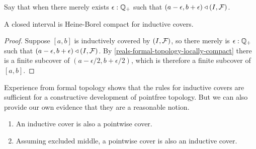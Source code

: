 Say that  when there merely exists $\epsilon : \mathbb{Q}_{+}$ such that $(a - \epsilon, b +
\epsilon) \triangleleft {\mathopen{}(I, \mathcal{F})\mathclose{}}$.

\begin{cor} \label{interval-Heine-Borel}
  A closed interval is Heine-Borel compact for inductive covers.
\end{cor}

\begin{proof}
  Suppose $[a, b]$ is inductively covered by ${\mathopen{}(I, \mathcal{F})\mathclose{}}$, so there merely is
  $\epsilon : \mathbb{Q}_{+}$ such that $(a - \epsilon, b + \epsilon) \triangleleft {\mathopen{}(I, \mathcal{F})\mathclose{}}$.
  By \autoref{reals-formal-topology-locally-compact} there is a finite subcover of
  $(a - \epsilon/2, b + \epsilon/2)$, which is therefore a finite subcover of $[a, b]$.
\end{proof}

Experience from formal topology shows that the rules for inductive covers are sufficient
for a constructive development of pointfree topology. But we can also provide our own
evidence that they are a reasonable notion.

\begin{thm} \label{inductive-cover-classical}
  \mbox{}
  \begin{enumerate}
  \item An inductive cover is also a pointwise cover.
  \item Assuming excluded middle, a pointwise cover is also an inductive cover.
  \end{enumerate}
\end{thm}

